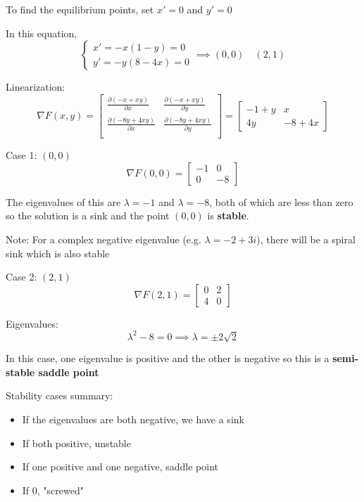 \documentclass[12pt]{article}
\begin{document}
To find the equilibrium points, set $x' = 0$ and $y' = 0$

In this equation,
\[\begin{cases}
    x' = -x(1 - y) = 0\\
    y' = -y(8 - 4x) = 0
\end{cases} \implies (0, 0) \quad (2, 1)\]

Linearization:
\[\nabla F(x, y) = \begin{bmatrix}
    \frac{\partial (-x + xy)}{\partial x} & \frac{\partial (-x + xy)}{\partial y}\\
    \frac{\partial (-8y + 4xy)}{\partial x} & \frac{\partial (-8y + 4xy)}{\partial y}\\
\end{bmatrix} = \begin{bmatrix}
    -1 + y & x\\
    4y & -8 + 4x
\end{bmatrix}\]

Case 1: $(0, 0)$
\[\nabla F(0, 0) = \begin{bmatrix}
    -1 & 0\\
    0 & -8
\end{bmatrix}\]

The eigenvalues of this are $\lambda = -1$ and $\lambda = - 8$, both of which are less than zero so the solution is a sink and the point $(0, 0)$ is \textbf{stable}.

Note: For a complex negative eigenvalue (e.g. $\lambda = -2 + 3i$), there will be a spiral sink which is also stable

Case 2: $(2, 1)$
\[\nabla F(2, 1) = \begin{bmatrix}
    0 & 2\\
    4 & 0
\end{bmatrix}\]

Eigenvalues:
\[\lambda^2 - 8 = 0 \implies \lambda = \pm 2\sqrt{2}\]

In this case, one eigenvalue is positive and the other is negative so this is a \textbf{semi-stable saddle point}

Stability cases summary:
\begin{itemize}
    \item If the eigenvalues are both negative, we have a sink
    \item If both positive, unstable
    \item If one positive and one negative, saddle point
    \item If 0, "screwed"
\end{itemize}
\end{document}

